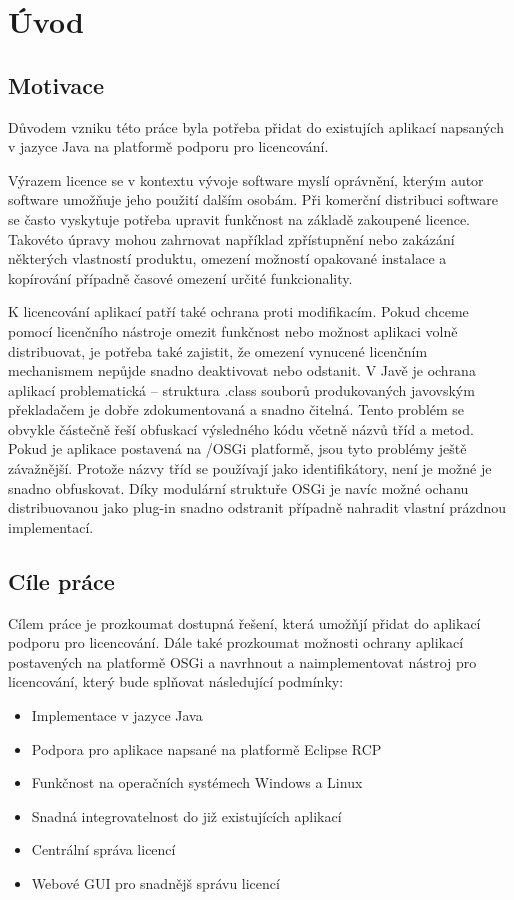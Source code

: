 \chapter{Úvod}

\section{Motivace}

Důvodem vzniku této práce byla potřeba přidat do existujích aplikací napsaných
v jazyce Java na platformě  podporu pro
licencování.

Výrazem licence se v kontextu vývoje software myslí oprávnění, kterým autor
software umožňuje jeho použití dalším osobám. Při komerční distribuci software
se často vyskytuje potřeba upravit funkčnost na základě zakoupené licence.
Takovéto úpravy mohou zahrnovat například zpřístupnění nebo zakázání některých
vlastností produktu, omezení možností opakované instalace a kopírování případně
časové omezení určité funkcionality.

K licencování aplikací patří také ochrana proti modifikacím. Pokud chceme
pomocí licenčního nástroje omezit funkčnost nebo možnost aplikaci volně
distribuovat, je potřeba také zajistit, že omezení vynucené licenčním
mechanismem nepůjde snadno deaktivovat nebo odstanit. V Javě je ochrana aplikací
problematická – struktura .class souborů produkovaných javovským překladačem je
dobře zdokumentovaná a snadno čitelná\cite{vmspec}. Tento problém se obvykle částečně
řeší obfuskací výsledného kódu včetně názvů tříd a metod. Pokud je aplikace postavená
na /\gls{OSGi} platformě, jsou tyto
problémy ještě závažnější. Protože názvy tříd se používají jako identifikátory, není je možné je snadno obfuskovat.
Díky modulární struktuře OSGi je navíc možné ochanu distribuovanou jako plug-in
snadno odstranit případně nahradit vlastní prázdnou implementací.
	
\section{Cíle práce}
Cílem práce je prozkoumat dostupná řešení, která umožňjí přidat do aplikací
podporu pro licencování. Dále také prozkoumat možnosti ochrany aplikací
postavených na platformě \gls{OSGi} a navrhnout a naimplementovat nástroj pro
licencování, který bude splňovat následující podmínky:
\begin{itemize}
  \item Implementace v jazyce Java
  \item Podpora pro aplikace napsané na platformě Eclipse RCP
  \item Funkčnost na operačních systémech Windows a Linux
  \item Snadná integrovatelnost do již existujících aplikací
  \item Centrální správa licencí
  \item Webové GUI pro snadnějš správu licencí
\end{itemize}
